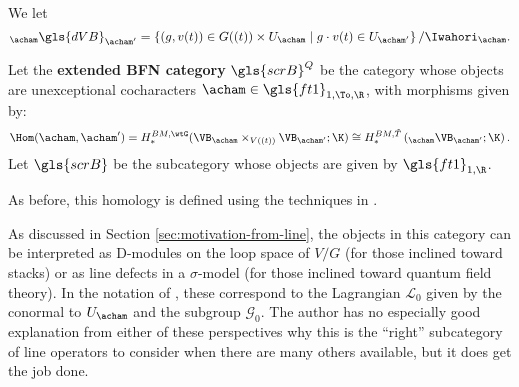 We let
\begin{equation}
{}_{\acham}\gls{dVB}_{\acham'}=\left\{(g,v(t))\in G((t))\times
        U_{\acham}\mid g\cdot v(t)\in
        U_{\acham'}\right\}/\Iwahori_{\acham}.\label{eq:aXa}
    \end{equation}
\begin{definition}\label{def:extended-BFN}
  Let the {\bf extended BFN category} $\gls{scrB}^Q$ be the category whose
  objects are unexceptional cocharacters $\acham\in  \gls{ft1}_{1,
  \To,\R}$, with morphisms given by:
  \begin{equation*}
    \Hom(\acham,\acham')=H_*^{BM, \wtG}(\VB_{\acham}\times_{V((t))}\VB_{\acham'};\K)\\
    \cong H_*^{BM, \tilde T}\left({}_{\acham}\VB_{\acham'};
    \K\right).
\end{equation*}
Let $\gls{scrB}$ be the subcategory whose objects are given by $\gls{ft1}_{1,\R}$.
\end{definition}
As before, this homology is defined using the techniques in \cite[\S
2(ii)]{BFN}.
\begin{physics}
  As discussed in Section \ref{sec:motivation-from-line}, the objects
  in this category can be interpreted as D-modules on the loop space
  of $V/G$ (for those inclined toward stacks) or as line defects in a
  $\sigma$-model (for those inclined toward quantum field theory).
  In the notation of  \cite[\S 4.3]{DGGH}, these correspond to the
  Lagrangian $\mathcal{L}_0$ given by the conormal to $U_{\acham}$ and
  the subgroup $\mathcal{G}_0$.   
  The author has no especially good explanation from either of these
  perspectives why this is the ``right'' subcategory of line operators
  to consider when there are many others available, but it does get the job done.
\end{physics}


